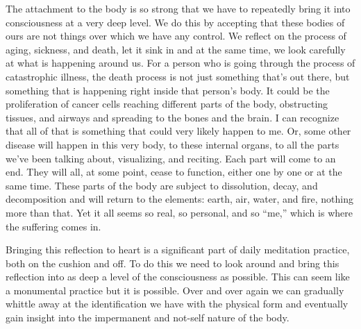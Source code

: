 The attachment to the body is so strong that we have to repeatedly 
bring it into consciousness at a very deep level. We do this by 
accepting that these bodies of ours are not things over which we have 
any control. We reflect on the process of aging, sickness, and death, 
let it sink in and at the same time, we look carefully at what is 
happening around us. For a person who is going through the process of 
catastrophic illness, the death process is not just something that's 
out there, but something that is happening right inside that person's 
body. It could be the proliferation of cancer cells reaching different 
parts of the body, obstructing tissues, and airways and spreading to 
the bones and the brain. I can recognize that all of that is something 
that could very likely happen to me. Or, some other disease will happen 
in this very body, to these internal organs, to all the parts we've 
been talking about, visualizing, and reciting. Each part will come to 
an end. They will all, at some point, cease to function, either one by 
one or at the same time. These parts of the body are subject to 
dissolution, decay, and decomposition and will return to the elements: 
earth, air, water, and fire, nothing more than that. Yet it all seems 
so real, so personal, and so ``me,'' which is where the suffering comes 
in.

Bringing this reflection to heart is a significant part of daily 
meditation practice, both on the cushion and off. To do this we need to 
look around and bring this reflection into as deep a level of the 
consciousness as possible. This can seem like a monumental practice but 
it is possible. Over and over again we can gradually whittle away at 
the identification we have with the physical form and eventually gain 
insight into the impermanent and not-self nature of the body.

